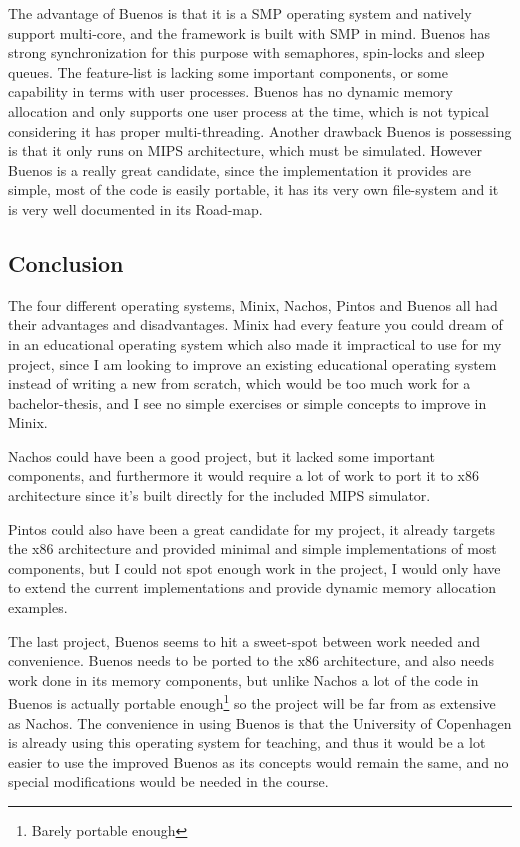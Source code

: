 The advantage of Buenos is that it is a SMP operating system and natively support multi-core, and the framework is built with SMP in mind. Buenos has strong synchronization for this purpose with semaphores, spin-locks and sleep queues. The feature-list is lacking some important components, or some capability in terms with user processes. Buenos has no dynamic memory allocation and only supports one user process at the time, which is not typical considering it has proper multi-threading. Another drawback Buenos is possessing is that it only runs on MIPS architecture, which must be simulated. However Buenos is a really great candidate, since the implementation it provides are simple, most of the code is easily portable, it has its very own file-system and it is very well documented in its Road-map. 

\subsection{Conclusion}

The four different operating systems, Minix, Nachos, Pintos and Buenos all had their advantages and disadvantages. Minix had every feature you could dream of in an educational operating system which also made it impractical to use for my project, since I am looking to improve an existing educational operating system instead of writing a new from scratch, which would be too much work for a bachelor-thesis, and I see no simple exercises or simple concepts to improve in Minix.

Nachos could have been a good project, but it lacked some important components, and furthermore it would require a lot of work to port it to x86 architecture since it's built directly for the included MIPS simulator.

Pintos could also have been a great candidate for my project, it already targets the x86 architecture and provided minimal and simple implementations of most components, but I could not spot enough work in the project, I would only have to extend the current implementations and provide dynamic memory allocation examples.

The last project, Buenos seems to hit a sweet-spot between work needed and convenience. Buenos needs to be ported to the x86 architecture, and also needs work done in its memory components, but unlike Nachos a lot of the code in Buenos is actually portable enough\footnote{Barely portable enough} so the project will be far from as extensive as Nachos. The convenience in using Buenos is that the University of Copenhagen is already using this operating system for teaching, and thus it would be a lot easier to use the improved Buenos as its concepts would remain the same, and no special modifications would be needed in the course.

